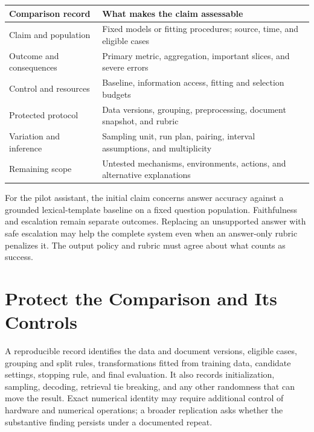 \par\addvspace{\intextsep}\noindent\begin{minipage}{\linewidth}
\centering\small
\begin{tabular}{@{}L{3.0cm}L{6.7cm}@{}}
\toprule
Comparison record & What makes the claim assessable \\
\midrule
Claim and population & Fixed models or fitting procedures; source, time, and eligible cases \\
Outcome and consequences & Primary metric, aggregation, important slices, and severe errors \\
Control and resources & Baseline, information access, fitting and selection budgets \\
Protected protocol & Data versions, grouping, preprocessing, document snapshot, and rubric \\
Variation and inference & Sampling unit, run plan, pairing, interval assumptions, and multiplicity \\
Remaining scope & Untested mechanisms, environments, actions, and alternative explanations \\
\bottomrule
\end{tabular}
\label{tab:prerun-claim-sheet}
\label{tab:experiment-claim-sheet}
\end{minipage}\par\addvspace{\intextsep}

For the pilot assistant, the initial claim concerns answer accuracy against a grounded lexical-template baseline on a fixed question population. Faithfulness and escalation remain separate outcomes. Replacing an unsupported answer with safe escalation may help the complete system even when an answer-only rubric penalizes it. The output policy and rubric must agree about what counts as success.

\section{Protect the Comparison and Its Controls}

A reproducible record identifies the data and document versions, eligible cases, grouping and split rules, transformations fitted from training data, candidate settings, stopping rule, and final evaluation. It also records initialization, sampling, decoding, retrieval tie breaking, and any other randomness that can move the result. Exact numerical identity may require additional control of hardware and numerical operations; a broader replication asks whether the substantive finding persists under a documented repeat.

